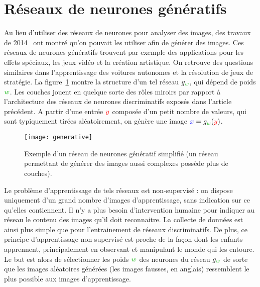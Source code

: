 

\section{Réseaux de neurones génératifs}

Au lieu d'utiliser des réseaux de neurones pour analyser des images, des travaux de 2014~\cite{goodfellow2014generative} ont montré qu'on pouvait les utiliser  afin de générer des images.
%
Ces réseaux de neurones génératifs trouvent par exemple des applications pour les effets spéciaux, les jeux vidéo et la création artistique. 
%
On retrouve des questions similaires dans l'apprentissage des voitures autonomes et la résolution de jeux de stratégie.
%
La figure~\ref{fig:generative} montre la structure d'un tel réseau $g_{\mygreen{w}}$, qui dépend de poids $\mygreen{w}$. Les couches jouent en quelque sorte des rôles miroirs par rapport à l'architecture des réseaux de neurones discriminatifs exposés dans l'article précédent.
%
A partir d'une entrée ${\color{red}y}$ composée d'un petit nombre de valeurs, qui sont typiquement tirées aléatoirement, on génère une image ${\color{blue} x} = g_{\mygreen{w}}({\color{red}y})$. 

\begin{figure}\centering
	\texttt{[image: generative]}
\caption{\label{fig:generative} Exemple d'un réseau de neurones génératif simplifié (un réseau permettant de générer des images aussi complexes possède plus de couches).  }
\end{figure}

Le problème d'apprentissage de tels réseaux est non-supervisé : on dispose uniquement d'un grand nombre d'images d'apprentissage, sans indication sur ce qu'elles contiennent.
%
Il n'y a plus besoin d'intervention humaine pour indiquer au réseau le contenu des images qu'il doit reconnaitre. 
La collecte de données est ainsi plus simple que pour l'entrainement de réseaux discriminatifs. De plus, ce principe d'apprentissage non supervisé est proche de la façon dont les enfants apprennent, principalement en observant et manipulant le monde qui les entoure.
%
Le but est alors de sélectionner les poids $\mygreen{w}$ des neurones du réseau $g_\mygreen{w}$ de sorte que les images aléatoires générées (les images fausses,  en anglais) ressemblent le plus possible aux images d'apprentissage. 

